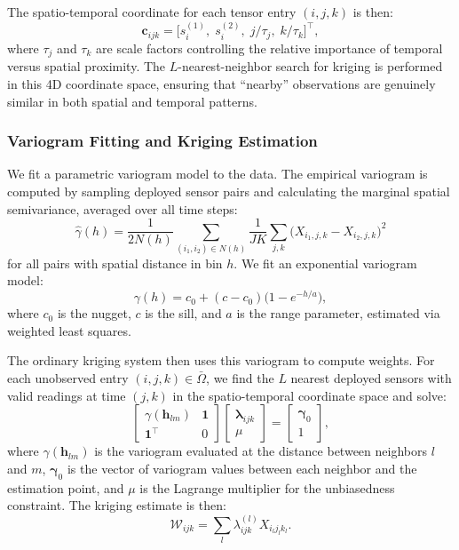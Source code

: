 \documentclass[journal]{IEEEtran}
\newcommand{\Wcal}{\mathcal{W}}
\newcommand{\Omegamis}{\bar{\Omega}}
\begin{document}
The spatio-temporal coordinate for each tensor entry $(i, j, k)$ is then:
\begin{equation}\label{eq:coord}
\mathbf{c}_{ijk} = \bigl[ s_i^{(1)},\; s_i^{(2)},\; j/\tau_j,\; k/\tau_k \bigr]^{\!\top},
\end{equation}
where $\tau_j$ and $\tau_k$ are scale factors controlling the relative importance of temporal versus spatial proximity. The $L$-nearest-neighbor search for kriging is performed in this 4D coordinate space, ensuring that ``nearby'' observations are genuinely similar in both spatial and temporal patterns.

\subsubsection{Variogram Fitting and Kriging Estimation}

We fit a parametric variogram model to the data. The empirical variogram is computed by sampling deployed sensor pairs and calculating the marginal spatial semivariance, averaged over all time steps:
\begin{equation}\label{eq:emp_vario}
\hat{\gamma}(h) = \frac{1}{2N(h)}\sum_{(i_1,i_2) \in N(h)} \frac{1}{JK}\sum_{j,k}\bigl(X_{i_1,j,k} - X_{i_2,j,k}\bigr)^{2}
\end{equation}
for all pairs with spatial distance in bin $h$. We fit an exponential variogram model:
\begin{equation}\label{eq:vario_model}
\gamma(h) = c_0 + (c - c_0)\bigl(1 - e^{-h/a}\bigr),
\end{equation}
where $c_0$ is the nugget, $c$ is the sill, and $a$ is the range parameter, estimated via weighted least squares.

The ordinary kriging system then uses this variogram to compute weights. For each unobserved entry $(i,j,k) \in \Omegamis$, we find the $L$ nearest deployed sensors with valid readings at time $(j,k)$ in the spatio-temporal coordinate space and solve:
\begin{equation}\label{eq:kriging_system}
\begin{bmatrix} \gamma(\mathbf{h}_{lm}) & \mathbf{1} \\ \mathbf{1}^{\!\top} & 0 \end{bmatrix}
\begin{bmatrix} \boldsymbol{\lambda}_{ijk} \\ \mu \end{bmatrix}
= \begin{bmatrix} \boldsymbol{\gamma}_{0} \\ 1 \end{bmatrix},
\end{equation}
where $\gamma(\mathbf{h}_{lm})$ is the variogram evaluated at the distance between neighbors $l$ and $m$, $\boldsymbol{\gamma}_0$ is the vector of variogram values between each neighbor and the estimation point, and $\mu$ is the Lagrange multiplier for the unbiasedness constraint. The kriging estimate is then:
\begin{equation}\label{eq:kriging_est}
\Wcal_{ijk} = \sum_{l}\lambda_{ijk}^{(l)} X_{i_l j_l k_l}.
\end{equation}
\end{document}
